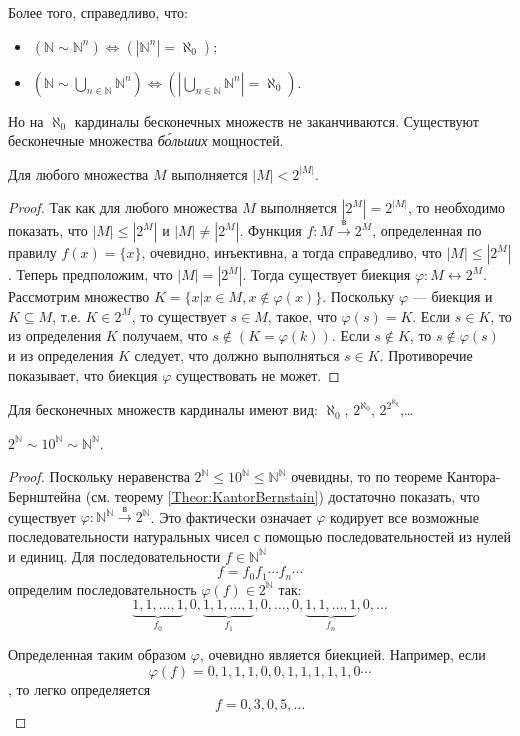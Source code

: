 Более того, справедливо, что:
\begin{itemize}
    \item $(\mathbb{N}\sim\mathbb{N}^n)\Leftrightarrow (|\mathbb{N}^n|=\aleph_0)$;
    \item $(\mathbb{N}\sim\bigcup_{n\in\mathbb{N}}\mathbb{N}^n) \Leftrightarrow (|\bigcup_{n\in\mathbb{N}}\mathbb{N}^n|=\aleph_0)$.
\end{itemize}

Но на $\aleph_0$ кардиналы бесконечных множеств не заканчиваются. Существуют бесконечные множества \emph{б\'{о}льших} мощностей.

\begin{Theor}\label{ch:pwr:kantor}
    Для любого множества $M$ выполняется $|M|<2^{|M|}$.
\end{Theor}
\begin{proof}
    Так как для любого множества $M$ выполняется $|2^M|=2^{|M|}$, то необходимо показать, что $|M|\leq|2^M|$ и $|M|\neq|2^M|$. Функция $f:M\xrightarrow{\text{в}}2^M$, определенная по правилу $f(x)=\{x\}$, очевидно, инъективна, а тогда справедливо, что $|M|\leq|2^M|$. Теперь предположим, что $|M|=|2^M|$. Тогда существует биекция $\varphi:M\leftrightarrow 2^M$. Рассмотрим множество $K=\{x|x\in M,x\not\in\varphi(x)\}$. Поскольку $\varphi$ --- биекция и $K\subseteq M$, т.е. $K\in 2^M$, то существует $s\in M$, такое, что $\varphi(s)=K$. Если $s\in K$, то из определения $K$ получаем, что $s\not\in(K=\varphi(k))$. Если $s\not\in K$, то $s\not\in\varphi(s)$ и из определения $K$ следует, что должно выполняться $s\in K$. Противоречие показывает, что биекция $\varphi$ существовать не может.
\end{proof}

Для бесконечных множеств кардиналы имеют вид: $\aleph_0$, $2^{\aleph_0}$, $2^{2^{\aleph_0}}$,\ldots

\begin{exampl}
    $2^\mathbb{N}\sim 10^\mathbb{N}\sim \mathbb{N}^\mathbb{N}$.
\end{exampl}
\begin{proof}
    Поскольку неравенства $2^\mathbb{N}\leq 10^\mathbb{N}\leq \mathbb{N}^\mathbb{N}$ очевидны, то по теореме Кантора-Бернштейна (см. теорему \ref{Theor:KantorBernstain}) достаточно показать, что существует $\varphi:\mathbb{N}^\mathbb{N}\xrightarrow{\text{в}}2^\mathbb{N}$. Это фактически означает $\varphi$ кодирует все возможные последовательности натуральных чисел с помощью последовательностей из нулей и единиц. Для последовательности $f\in\mathbb{N}^\mathbb{N}$ 
    \[f=f_0f_1\cdots f_n\cdots\]
    определим последовательность $\varphi(f)\in 2^\mathbb{N}$ так:
    \[
        \underbrace{1,1,\ldots,1}_{f_0},0,
        \underbrace{1,1,\ldots,1}_{f_1},0,\ldots,0,
        \underbrace{1,1,\ldots,1}_{f_n},0,\ldots
    \]
    
    Определенная таким образом $\varphi$, очевидно является  биекцией. Например, если
    \[\varphi(f)=0,1,1,1,0,0,1,1,1,1,1,0\cdots\], то легко определяется \[f=0,3,0,5,\ldots\]
\end{proof}

